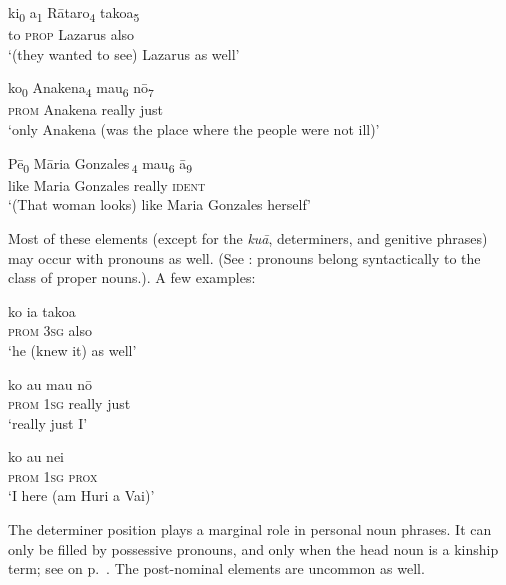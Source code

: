 \ea\label{ex:5.180}
\gll ki\textsubscript{0} a\textsubscript{1} Rātaro\textsubscript{4} tako{\ꞌ}a\textsubscript{5} \\
to \textsc{prop} Lazarus also \\

\glt 
‘(they wanted to see) Lazarus as well’ \textstyleExampleref{[John 12:9]}
\z

\ea\label{ex:5.181}
\gll ko\textsubscript{0} {\ꞌ}Anakena\textsubscript{4} mau\textsubscript{6} nō\textsubscript{7} \\
\textsc{prom} Anakena really just \\

\glt 
‘only Anakena (was the place where the people were not ill)’ \textstyleExampleref{[R231.098]} 
\z

\ea\label{ex:5.182}
\gll Pē\textsubscript{0} {\ob}Māria Gonzales\,{\cb}\textsubscript{4} mau\textsubscript{6} {\ꞌ}ā\textsubscript{9} \\
like {\db}Maria Gonzales really \textsc{ident} \\

\glt 
‘(That woman looks) like Maria Gonzales herself’ \textstyleExampleref{[R416.360]} 
\z

Most of these elements (except for the \textit{kuā}, determiners, and genitive phrases) may occur with pronouns as well. (See : pronouns belong syntactically to the class of proper nouns.). A few examples:

\ea\label{ex:5.183}
\gll ko ia tako{\ꞌ}a \\
\textsc{prom} \textsc{3sg} also \\

\glt 
‘he (knew it) as well’ \textstyleExampleref{[R620.037]} 
\z

\ea\label{ex:5.184}
\gll ko au mau nō \\
\textsc{prom} \textsc{1sg} really just \\

\glt 
‘really just I’ \textstyleExampleref{[R404.048]} 
\z

\ea\label{ex:5.185}
\gll ko au nei\\
\textsc{prom} \textsc{1sg} \textsc{prox}\\

\glt 
‘I here (am Huri a Vai)’ \textstyleExampleref{[R304.086]} 
\z

The determiner position plays a marginal role in personal noun phrases. It can only be filled by possessive pronouns, and only when the head noun is a kinship term; see  on p.~\pageref{ex:5.198}. The post-nominal elements are uncommon as well. 

